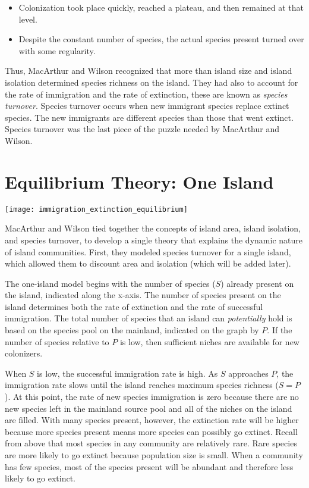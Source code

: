 \documentclass{tufte-handout}
\begin{document}
\begin{itemize}
	\item Colonization took place quickly, reached a plateau, and then remained at that level.  
	\item Despite the constant number of species, the actual species present turned over with some regularity.
\end{itemize}

Thus, MacArthur and Wilson recognized that more than island size and island isolation determined species richness on the island.  They had also to account for the rate of immigration and the rate of extinction, these are known as \textit{species turnover}. Species turnover occurs when new immigrant species replace extinct species. The new immigrants are different species than those that went extinct.  Species turnover was the last piece of the puzzle needed by MacArthur and Wilson.

\section{Equilibrium Theory: One Island}
\begin{marginfigure}%
	\centering
	\texttt{[image: immigration\_extinction\_equilibrium]}
\end{marginfigure} 

MacArthur and Wilson tied together the concepts of island area, island isolation, and species turnover, to develop a single theory that explains the dynamic nature of island communities. First, they modeled species turnover for a single island, which allowed them to discount area and isolation (which will be added later).

The one-island model begins with the number of species ($S$) already present on the island, indicated along the x-axis.  The number of species present on the island determines both the rate of extinction and the rate of successful immigration.   The total number of species that an island can \textit{potentially} hold is based on the  species pool on the mainland, indicated on the graph by $P$. If the number of species relative to $P$ is low, then sufficient niches are available for new colonizers.  

When $S$ is low, the successful immigration rate is high. As $S$ approaches $P$, the immigration rate slows until the island reaches maximum species richness ($S=P$).  At this point, the rate of new species immigration is zero because there are no new species left in the mainland source pool and all of the niches on the island are filled. With many species present, however, the extinction rate will be higher because more species present means more species can possibly go extinct. Recall from above that most species in any community are relatively rare.  Rare species are more likely to go extinct because population size is small. When a community has few species, most of the species present will be abundant and therefore less likely to go extinct.
\end{document}

